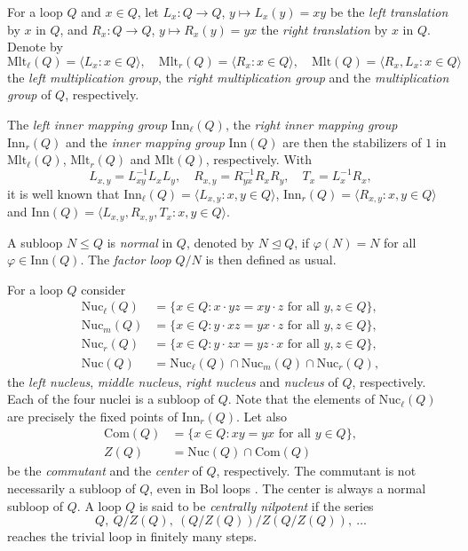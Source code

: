 \documentclass[12pt,reqno]{amsart}
\numberwithin{equation}{section}
\theoremstyle{plain}
\theoremstyle{definition}
\newcommand{\inv}{^{-1}}
\newcommand{\mlt}[1]{\mathrm{Mlt}(#1)}
\newcommand{\rmlt}[1]{\mathrm{Mlt}_r(#1)}
\newcommand{\lmlt}[1]{\mathrm{Mlt}_\ell(#1)}
\newcommand{\linn}[1]{\mathrm{Inn}_\ell(#1)}
\newcommand{\rinn}[1]{\mathrm{Inn}_r(#1)}
\newcommand{\inn}[1]{\mathrm{Inn}(#1)}
\newcommand{\nuc}[1]{\mathrm{Nuc}(#1)}
\newcommand{\lnuc}[1]{\mathrm{Nuc}_\ell(#1)}
\newcommand{\rnuc}[1]{\mathrm{Nuc}_r(#1)}
\newcommand{\mnuc}[1]{\mathrm{Nuc}_m(#1)}
\newcommand{\com}[1]{\mathrm{Com}(#1)}
\newcommand{\lt}{L}
\newcommand{\rt}{R}
\newcommand{\tm}{T}
\begin{document}
For a loop $Q$ and $x\in Q$, let $\lt_x:Q\to Q$, $y\mapsto \lt_x(y)=xy$ be the \emph{left translation} by $x$ in $Q$, and $\rt_x:Q\to Q$, $y\mapsto \rt_x(y)=yx$ the \emph{right translation} by $x$ in $Q$. Denote by
\begin{displaymath}
	\lmlt{Q} = \langle \lt_x:x\in Q\rangle,\quad \rmlt{Q} = \langle \rt_x:x\in Q\rangle,\quad \mlt{Q} = \langle \rt_x,\lt_x:x\in Q\rangle
\end{displaymath}
the \emph{left multiplication group}, the \emph{right multiplication group} and the \emph{multiplication group} of $Q$, respectively.

The \emph{left inner mapping group} $\linn{Q}$,  the \emph{right inner mapping group} $\rinn{Q}$ and the \emph{inner mapping group} $\inn{Q}$ are then the stabilizers of $1$ in $\lmlt{Q}$, $\rmlt{Q}$ and $\mlt{Q}$, respectively. With
\begin{displaymath}
	\lt_{x,y} = \lt_{xy}^{-1}\lt_x\lt_y,\quad \rt_{x,y} = \rt_{yx}^{-1}\rt_x\rt_y,\quad \tm_x=\lt_x\inv\rt_x,
\end{displaymath}
it is well known that $\linn{Q}=\langle \lt_{x,y}:x,y\in Q\rangle$, $\rinn{Q} = \langle \rt_{x,y}:x,y\in Q\rangle$ and $\inn{Q}=\langle \lt_{x,y},\rt_{x,y},\tm_x:x,y\in
Q\rangle$.

A subloop $N\le Q$ is \emph{normal} in $Q$, denoted by $N\unlhd Q$, if $\varphi(N)=N$ for all $\varphi\in\inn{Q}$. The \emph{factor loop} $Q/N$ is then defined as usual.

For a loop $Q$ consider
\begin{align*}
	\lnuc{Q} &= \{x\in Q:x\cdot yz = xy\cdot z\text{ for all }y,z\in Q\},\\
	\mnuc{Q} &= \{x\in Q:y\cdot xz = yx\cdot z\text{ for all }y,z\in Q\},\\
	\rnuc{Q} &= \{x\in Q:y\cdot zx = yz\cdot x\text{ for all }y,z\in Q\},\\
	\nuc{Q} &= \lnuc{Q}\cap\mnuc{Q}\cap\rnuc{Q},
\end{align*}
the \emph{left nucleus}, \emph{middle nucleus}, \emph{right nucleus} and \emph{nucleus} of $Q$, respectively. Each of the four nuclei is a subloop of $Q$. Note that the elements of $\lnuc{Q}$ are precisely the fixed points of $\rinn{Q}$. Let also
\begin{align*}
	\com{Q} &= \{x\in Q:xy = yx\text{ for all }y\in Q\},\\
	Z(Q) &= \nuc{Q}\cap\com{Q}
\end{align*}
be the \emph{commutant} and the \emph{center} of $Q$, respectively. The commutant is not necessarily a subloop of $Q$, even in Bol loops \cite{KPV_comm}. The center is always a normal subloop of $Q$. A loop $Q$ is said to be \emph{centrally nilpotent} if the series
\begin{displaymath}
	Q,\ Q/Z(Q),\ (Q/Z(Q))/Z(Q/Z(Q)),\ \dots
\end{displaymath}
reaches the trivial loop in finitely many steps.
\end{document}
